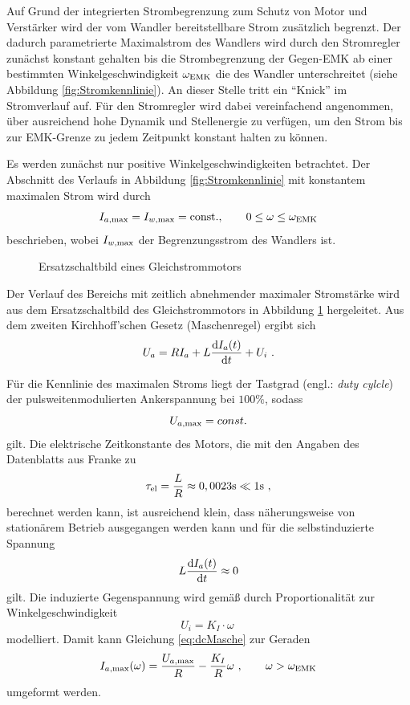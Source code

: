 Auf Grund der integrierten Strombegrenzung zum Schutz von Motor und Verstärker wird der vom Wandler bereitstellbare Strom zusätzlich begrenzt. Der dadurch parametrierte Maximalstrom des Wandlers wird durch den Stromregler zunächst konstant gehalten bis die Strombegrenzung der Gegen-EMK ab einer bestimmten Winkelgeschwindigkeit $\omega_{\mathrm{EMK}}$ die des Wandler unterschreitet (siehe Abbildung \ref{fig:Stromkennlinie}). An dieser Stelle tritt ein "`Knick"' im Stromverlauf auf. Für den Stromregler wird dabei vereinfachend angenommen, über ausreichend hohe Dynamik und Stellenergie zu verfügen, um den Strom bis zur EMK-Grenze zu jedem Zeitpunkt konstant halten zu können.

Es werden zunächst nur positive Winkelgeschwindigkeiten betrachtet. 
Der Abschnitt des Verlaufs in Abbildung \ref{fig:Stromkennlinie} mit konstantem maximalen Strom wird durch
\begin{equation}
	I_{a \mathrm{, max}}  = I_{w\mathrm{, max}} = \mathrm{const.}, \qquad 0 \leq \omega \leq \omega_{\mathrm{EMK}}
	\label{eq:Iconst}
\end{equation}
beschrieben, wobei $I_{w\mathrm{, max}}$ der Begrenzungsstrom des Wandlers ist.

\begin{figure}[h]
	\centering
		
	\caption{Ersatzschaltbild eines Gleichstrommotors}
	\label{fig:dcESB}
\end{figure}

Der Verlauf des Bereichs mit zeitlich abnehmender maximaler Stromstärke wird aus dem Ersatzschaltbild des Gleichstrommotors in Abbildung \ref{fig:dcESB} hergeleitet. Aus dem zweiten Kirchhoff'schen Gesetz (Maschenregel) ergibt sich
\begin{equation}
	U_a =  RI_a + L \frac{\mathrm{d}I_a(t)}{\mathrm{d}t} + U_i \ . 
	\label{eq:dcMasche}
\end{equation}

Für die Kennlinie des maximalen Stroms liegt der Tastgrad (engl.: \textit{duty cylcle}) der pulsweitenmodulierten Ankerspannung bei $100\%$, sodass 
\[
	U_{a \mathrm{, max}}  = const.
\]
gilt. Die elektrische Zeitkonstante des Motors, die mit den Angaben des Datenblatts aus Franke \cite{franke} zu 
\[
	\tau_{\mathrm{el}} = \frac{L}{R} \approx 0,0023 \mathrm{s} \ll 1 \mathrm{s} \ ,
\]
berechnet werden kann, ist ausreichend klein, dass näherungsweise von stationärem Betrieb ausgegangen werden kann und für die selbstinduzierte Spannung 
\[
	L \frac{\mathrm{d}I_a(t)}{\mathrm{d}t} \approx 0
\]
gilt. Die induzierte Gegenspannung wird gemäß \cite{binder} durch Proportionalität zur Winkelgeschwindigkeit
\[
	U_i  = K_I \cdot \omega \ 
\]
modelliert.
Damit kann Gleichung \eqref{eq:dcMasche} zur Geraden
\begin{equation}
	I_{a \mathrm{, max}}(\omega) = \frac{U_{a \mathrm{, max}}}{R} - \frac{K_I}{R} \omega \ , \qquad \omega > \omega_{\mathrm{EMK}} 
	\label{eq:Ivar}
\end{equation}
umgeformt werden.

